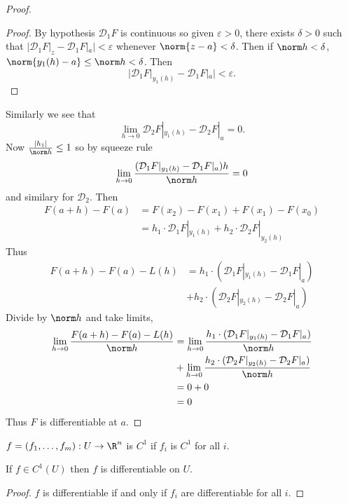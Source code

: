 \documentclass[a4paper]{article}
\newcommand*{\D}{\mathcal{D}}
\theoremstyle{definition}
\begin{document}
\begin{proof}
  \begin{proof}
    By hypothesis \(\D_1 F\) is continuous so given \(\varepsilon > 0\), there exists \(\delta > 0\) such that \(|\D_1 F|_z - \D_1 F|_a| < \varepsilon\) whenever \(\norm{z - a} < \delta\). Then if \(\norm h < \delta\), \(\norm{y_1(h) - a} \leq \norm h < \delta\). Then
    \[
      |\D_1 F|_{y_1(h)} - \D_1 F|_a| < \varepsilon.
    \]
  \end{proof}
  Similarly we see that
  \[
    \lim_{h \to 0} \D_2 F|_{y_1(h)} - \D_2 F|_a = 0.
  \]
  Now \(\frac{|h_1|}{\norm h} \leq 1\) so by squeeze rule
  \[
    \lim_{h \to 0} \frac{(\D_1 F|_{y_1(h)} - \D_1 F|_a)h}{\norm h} = 0
  \]
  and similary for \(\D_2\). Then
  \begin{align*}
    F(a + h) - F(a) &= F(x_2) - F(x_1) + F(x_1) - F(x_0) \\
                    &= h_1 \cdot \D_1 F|_{y_1(h)} + h_2 \cdot \D_2 F|_{y_2(h)}
  \end{align*}
  Thus
  \begin{align*}
    F(a + h) - F(a) - L(h) &= h_1 \cdot (\D_1 F|_{y_1(h)} - \D_1 F|_a) \\
    &+ h_2 \cdot (\D_2 F|_{y_2(h)} - \D_2 F|_a)
  \end{align*}
  Divide by \(\norm h\) and take limits,
  \begin{align*}
    \lim_{h \to 0} \frac{F(a + h) - F(a) - L(h)}{\norm h} &= \lim_{h \to 0} \frac{h_1 \cdot (\D_1 F|_{y_1(h)} - \D_1 F|_a)}{\norm h} \\
    &+ \lim_{h \to 0} \frac{h_2 \cdot (\D_2 F|_{y_2(h)} - \D_2 F|_a)}{\norm h} \\
                                                          &= 0 + 0 \\
                                                          &= 0
  \end{align*}
  Thus \(F\) is differentiable at \(a\).
\end{proof}

\begin{definition}[\(C^1\) space]
  \(f = (f_1, \dots, f_m): U \to \R^n\) is \(C^1\) if \(f_i\) is \(C^1\) for all \(i\).
\end{definition}

\begin{corollary}
  If \(f \in C^1(U)\) then \(f\) is differentiable on \(U\).
\end{corollary}

\begin{proof}
  \(f\) is differentiable if and only if \(f_i\) are differentiable for all \(i\).
\end{proof}
\end{document}
